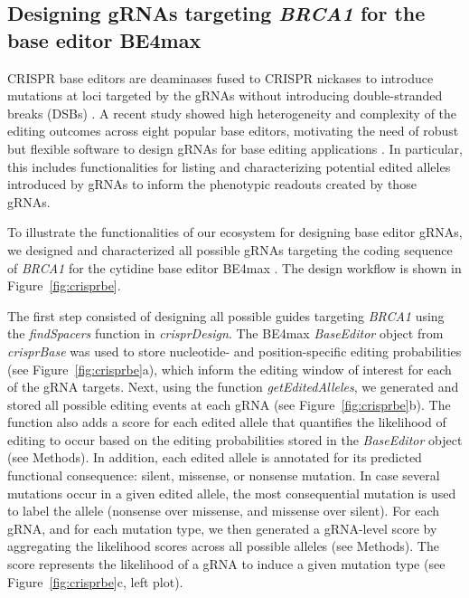 \documentclass[pdftex,english,10pt]{article}
\begin{document}
\begin{figure}
{  }
  \label{fig:rankings}
\end{figure}




\subsection{Designing gRNAs targeting \textit{BRCA1} for the base editor BE4max} 

CRISPR base editors are deaminases fused to CRISPR nickases to introduce mutations at loci targeted by the gRNAs without introducing double-stranded breaks (DSBs) \citep{gaudelli,komor}. A recent study showed high heterogeneity and complexity of the editing outcomes across eight popular base editors, motivating the need of robust but flexible software to design gRNAs for base editing applications \citep{behive}. In particular, this includes functionalities for listing and characterizing potential edited alleles introduced by gRNAs to inform the phenotypic readouts created by those gRNAs.

To illustrate the functionalities of our ecosystem for designing base editor gRNAs, we designed and characterized all possible gRNAs targeting the coding sequence of \textit{BRCA1} for the cytidine base editor BE4max \citep{koblan2018improving}. The design workflow is shown in Figure~\ref{fig:crisprbe}. 

The first step consisted of designing all possible guides targeting \textit{BRCA1} using the \textit{findSpacers} function in \textit{crisprDesign}. The BE4max \textit{BaseEditor} object from \textit{crisprBase} was used to store nucleotide- and position-specific editing probabilities (see Figure~\ref{fig:crisprbe}a), which inform the editing window of interest for each of the gRNA targets. Next, using the function \textit{getEditedAlleles}, we generated and stored all possible editing events at each gRNA (see Figure~\ref{fig:crisprbe}b). The function also adds a score for each edited allele that quantifies the likelihood of editing to occur based on the editing probabilities stored in the \textit{BaseEditor} object (see Methods). In addition, each edited allele is annotated for its predicted functional consequence: silent, missense, or nonsense mutation. In case several mutations occur in a given edited allele, the most consequential mutation is used to label the allele (nonsense over missense, and missense over silent).  For each gRNA, and for each mutation type, we then generated a gRNA-level score by aggregating the likelihood scores across all possible alleles (see Methods). The score represents the likelihood of a gRNA to induce a given mutation type (see Figure~\ref{fig:crisprbe}c, left plot). 
\end{document}
